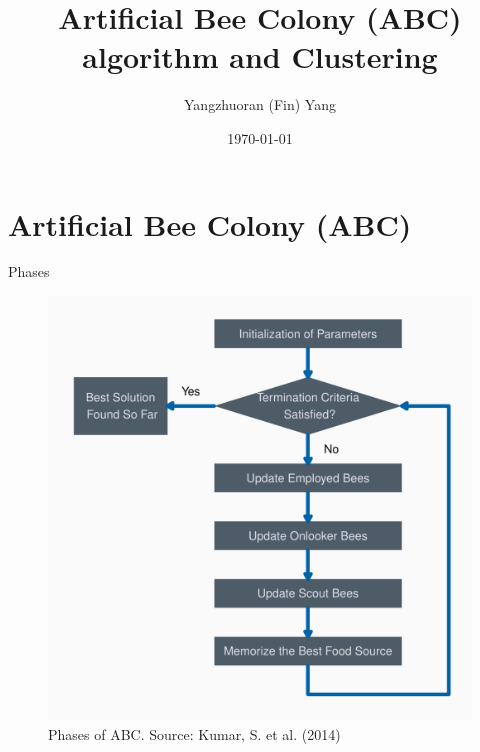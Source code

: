 \documentclass[14pt,ignorenonframetext,compress]{beamer}
\title[]{Artificial Bee Colony (ABC) algorithm and Clustering}
\author[
        Yangzhuoran (Fin) Yang
    ]{Yangzhuoran (Fin) Yang}
\date[
      \today
  ]{
      \today
        }
\begin{document}
  \begin{frame}[plain]
  \titlepage
  \end{frame}



\hypertarget{artificial-bee-colony-abc}{%
\section{Artificial Bee Colony (ABC)}\label{artificial-bee-colony-abc}}

\begin{frame}{Phases}
\protect\hypertarget{phases}{}

\begin{figure}
\includegraphics[width=0.63\linewidth]{pre1_files/figure-beamer/ABC-1} \caption{Phases of ABC. Source: Kumar, S. et al. (2014)}\label{fig:ABC}
\end{figure}

\end{frame}
\end{document}
